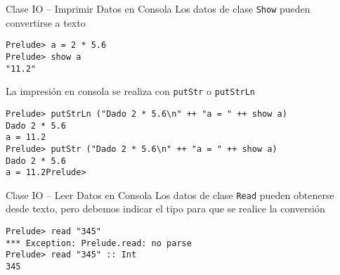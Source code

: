 \begin{frame}[fragile]{Clase IO -- Imprimir Datos en Consola}
    Los datos de clase \verb|Show| pueden convertirse a texto
    \begin{lstlisting}[style=consola]
Prelude> a = 2 * 5.6
Prelude> show a
"11.2"
    \end{lstlisting}
    La impresión en consola se realiza con  \verb|putStr| o \verb|putStrLn|
    \begin{lstlisting}[style=consola]
Prelude> putStrLn ("Dado 2 * 5.6\n" ++ "a = " ++ show a)
Dado 2 * 5.6
a = 11.2
Prelude> putStr ("Dado 2 * 5.6\n" ++ "a = " ++ show a)
Dado 2 * 5.6
a = 11.2Prelude>
    \end{lstlisting}    
\end{frame}

\begin{frame}[fragile]{Clase IO -- Leer Datos en Consola}
    Los datos de clase \verb|Read| pueden obtenerse desde texto,
    pero debemos indicar el tipo para que se realice la conversión
    \begin{lstlisting}[style=consola]
Prelude> read "345"
*** Exception: Prelude.read: no parse
Prelude> read "345" :: Int
345
    \end{lstlisting}
\end{frame}

